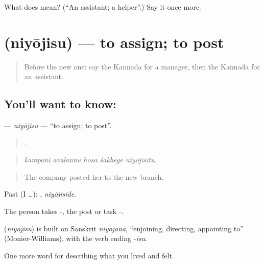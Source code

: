 \begin{tcolorbox}[breakable,colback=teal!4,colframe=teal!35!black,title={Before you move on}]
What does  mean? (\textquotedblleft{}An assistant; a helper\textquotedblright{}.) Say it once more.
\end{tcolorbox}
\section[\texorpdfstring{\kn{ನಿಯೋಜಿಸು} (niyōjisu)}{ನಿಯೋಜಿಸು (niyōjisu)}]{ (niyōjisu) — to assign; to post}

\label{lesson:KA-C519-niyojisu}



\begin{quote}
Before the new one: say the Kannada for a manager, then the Kannada for an assistant.
\end{quote}

\subsection*{You'll want to know: }
\textbf{} — \emph{niyōjisu} — \textquotedblleft{}to assign; to post\textquotedblright{}.

\begin{quote}
    .
\end{quote}

\begin{quote}
\emph{kampani avaḷannu hosa śākhege niyōjisitu.}
\end{quote}

\begin{quote}
The company posted her to the new branch.
\end{quote}

Past (I …): , \emph{niyōjiside}.

The person takes -, the post or task -.

\begin{cousinweb}
\textbf{} (\emph{niyōjisu}) is built on Sanskrit \emph{niyojana}, \textquotedblleft{}enjoining, directing, appointing to\textquotedblright{} (Monier-Williams), with the verb ending -\emph{isu}.
\end{cousinweb}

\begin{grammarlens}[title={What you've built}]
One more word for describing what you lived and felt.
\end{grammarlens}

